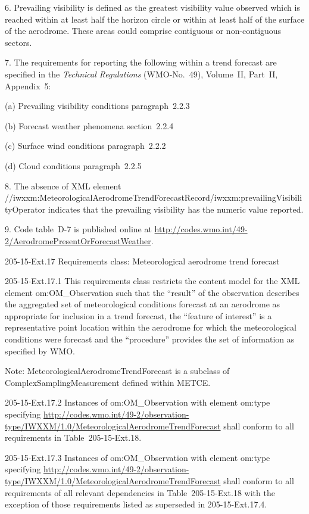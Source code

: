 6. Prevailing visibility is defined as the greatest visibility value observed which is reached within at least half the horizon circle or within at least half of the surface of the aerodrome. These areas could comprise contiguous or non-contiguous sectors.

7. The requirements for reporting the following within a trend forecast are specified in the \emph{Technical Regulations} (WMO-No.~49), Volume~II, Part~II, Appendix~5:

(a) Prevailing visibility conditions paragraph~2.2.3

(b) Forecast weather phenomena section~2.2.4

(c) Surface wind conditions paragraph~2.2.2

(d) Cloud conditions paragraph~2.2.5

8. The absence of XML element //iwxxm:MeteorologicalAerodromeTrendForecastRecord/iwxxm:prevailingVisibilityOperator indicates that the prevailing visibility has the numeric value reported.

9. Code table~D-7 is published online at \url{http://codes.wmo.int/49-2/AerodromePresentOrForecastWeather}.

205-15-Ext.17 Requirements class: Meteorological aerodrome trend forecast

205-15-Ext.17.1 This requirements class restricts the content model for the XML element om:OM\_Observation such that the ``result'' of the observation describes the aggregated set of meteorological conditions forecast at an aerodrome as appropriate for inclusion in a trend forecast, the ``feature of interest'' is a representative point location within the aerodrome for which the meteorological conditions were forecast and the ``procedure'' provides the set of information as specified by WMO.

Note: MeteorologicalAerodromeTrendForecast is a subclass of ComplexSamplingMeasurement defined within METCE.

205-15-Ext.17.2 Instances of om:OM\_Observation with element om:type specifying \url{http://codes.wmo.int/49-2/observation-type/IWXXM/1.0/MeteorologicalAerodromeTrendForecast} shall conform to all requirements in Table~205-15-Ext.18.

205-15-Ext.17.3 Instances of om:OM\_Observation with element om:type specifying \url{http://codes.wmo.int/49-2/observation-type/IWXXM/1.0/MeteorologicalAerodromeTrendForecast} shall conform to all requirements of all relevant dependencies in Table~205-15-Ext.18 with the exception of those requirements listed as superseded in 205-15-Ext.17.4.

